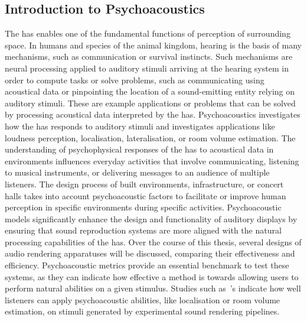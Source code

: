 \subsection{Introduction to Psychoacoustics}\label{sec:bg-psychoacoustics}
The \acrshort{has} enables one of the fundamental functions of perception of surrounding space. In humans and species of the animal kingdom, hearing is the basis of many mechanisms, such as communication or survival instincts. Such mechanisms are neural processing applied to auditory stimuli arriving at the hearing system in order to compute tasks or solve problems, such as communicating using acoustical data or pinpointing the location of a sound-emitting entity relying on auditory stimuli. These are example applications or problems that can be solved by processing acoustical data interpreted by the \acrshort{has}.
Psychoacoustics investigates how the \acrshort{has} responds to auditory stimuli and investigates applications like loudness perception, localisation, lateralisation, or room volume estimation. The understanding of psychophysical responses of the \acrshort{has} to acoustical data in environments influences everyday activities that involve communicating, listening to musical instruments, or delivering messages to an audience of multiple listeners. The design process of built environments, infrastructure, or concert halls takes into account psychoacoustic factors to facilitate or improve human perception in specific environments during specific activities.
Psychoacoustic models significantly enhance the design and functionality of auditory displays by ensuring that sound reproduction systems are more aligned with the natural processing capabilities of the \acrshort{has}. Over the course of this thesis, several designs of audio rendering apparatuses will be discussed, comparing their effectiveness and efficiency. Psychoacoustic metrics provide an essential benchmark to test these systems, as they can indicate how effective a method is towards allowing users to perform natural abilities on a given stimulus. Studies such as~\cite{rungta2016psychoacoustic}'s indicate how well listeners can apply psychoacoustic abilities, like localisation or room volume estimation, on stimuli generated by experimental sound rendering pipelines.

